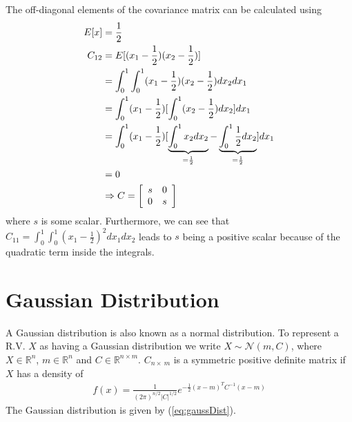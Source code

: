 The off-diagonal elements of the covariance matrix can be calculated using
\begin{align*}
E[x] &= \frac{1}{2} \\
C_{12} &= E[(x_1 - \frac{1}{2})(x_2 - \frac{1}{2})] \\
&= \int_0^1 \int_0^1 (x_1 - \frac{1}{2})(x_2 - \frac{1}{2})dx_2dx_1 \\
&= \int_0^1 (x_1 - \frac{1}{2})[\int_0^1 (x_2 - \frac{1}{2})dx_2]dx_1 \\
&= \int_0^1 (x_1 - \frac{1}{2})[\underbrace{\int_0^1 x_2dx_2}_{= \frac{1}{2}} - \underbrace{\int_0^1 \frac{1}{2}dx_2}_{= \frac{1}{2}}]dx_1 \\
&= 0 \\
&\Rightarrow C = \left[\begin{array}{c c} s & 0 \\ 0 & s \end{array}\right]
\end{align*}
where $s$ is some scalar.
Furthermore, we can see that \\
$C_{11} = \int_0^1\int_0^1{(x_1-\frac{1}{2})}^2dx_1dx_2$ leads to $s$ being a positive scalar because of the quadratic term inside the integrals.

\section{Gaussian Distribution}
A Gaussian distribution is also known as a normal distribution.
To represent a R.V. $X$ as having a Gaussian distribution we write $X \sim \mathcal{N}(m,C)$, where $X \in \mathbb{R}^n$, $m \in \mathbb{R}^n$ and $C \in \mathbb{R}^{n \times m}$.
$C_{n\times~m}$ is a symmetric positive definite matrix if $X$ has a density of
\begin{align}
\label{eq:gaussDist}
f(x) = \frac{1}{{(2\pi)}^{n/2}|C|^{1/2}} e^{-\frac{1}{2}{(x-m)}^T C^{-1}(x-m)}
\end{align}
The Gaussian distribution is given by (\ref{eq:gaussDist}).
